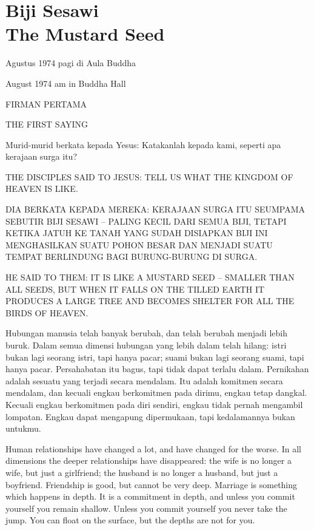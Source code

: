 \chapter{Biji Sesawi\\The Mustard Seed}

 Agustus 1974 pagi di Aula Buddha

 August 1974 am in Buddha Hall

\bahasa
FIRMAN PERTAMA

\english
THE FIRST SAYING

\bahasa
Murid-murid berkata kepada Yesus: Katakanlah kepada kami, seperti apa kerajaan surga itu?

\english
THE DISCIPLES SAID TO JESUS: TELL US WHAT THE KINGDOM OF HEAVEN IS LIKE.

\bahasa
DIA BERKATA KEPADA MEREKA: KERAJAAN SURGA ITU SEUMPAMA SEBUTIR BIJI SESAWI -- PALING KECIL DARI SEMUA BIJI, TETAPI KETIKA JATUH KE TANAH YANG SUDAH DISIAPKAN BIJI INI MENGHASILKAN SUATU POHON BESAR DAN MENJADI SUATU TEMPAT BERLINDUNG BAGI BURUNG-BURUNG DI SURGA.

\english
HE SAID TO THEM: IT IS LIKE A MUSTARD SEED -- SMALLER THAN ALL SEEDS, BUT WHEN
IT FALLS ON THE TILLED EARTH IT PRODUCES A LARGE TREE AND BECOMES SHELTER
FOR ALL THE BIRDS OF HEAVEN.

\bahasa
Hubungan manusia telah banyak berubah, dan telah berubah menjadi lebih buruk. Dalam semua dimensi hubungan yang lebih dalam telah hilang: istri bukan lagi seorang istri, tapi hanya pacar; suami bukan lagi seorang suami, tapi hanya pacar. Persahabatan itu bagus, tapi tidak dapat terlalu dalam. Pernikahan adalah sesuatu yang terjadi secara mendalam. Itu adalah komitmen secara mendalam, dan kecuali engkau berkomitmen pada dirimu, engkau tetap dangkal. Kecuali engkau berkomitmen pada diri sendiri, engkau tidak pernah mengambil lompatan. Engkau dapat mengapung dipermukaan, tapi kedalamannya bukan untukmu.

\english
Human relationships have changed a lot, and have changed for the worse. In all dimensions the deeper relationships have disappeared: the wife is no longer a wife, but just a girlfriend; the husband is no longer a husband, but just a boyfriend. Friendship is good, but cannot be very deep. Marriage is something which happens in depth. It is a commitment in depth, and unless you commit yourself you remain shallow. Unless you commit yourself you never take the jump. You can float on the surface, but the depths are not for you.

